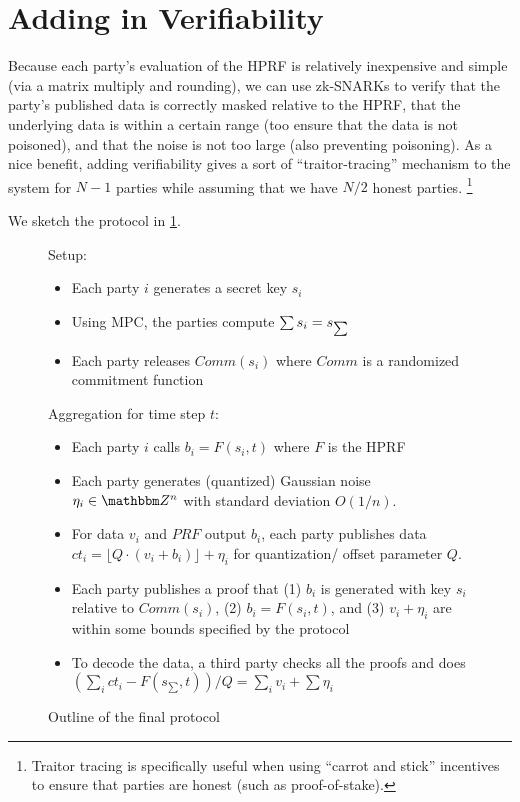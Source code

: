 \section{Adding in Verifiability}
Because each party's evaluation of the HPRF is relatively inexpensive and simple (via a matrix multiply and rounding), we can use zk-SNARKs to verify that the party's published data is correctly masked relative to the HPRF, that the underlying data is within a certain range (too ensure that the data is not poisoned), and that the noise is not too large (also preventing poisoning).
As a nice benefit, adding verifiability gives a sort of ``traitor-tracing'' mechanism to the system for $N - 1$ parties while assuming that we have $N /2$ honest parties.
\footnote{Traitor tracing is specifically useful when using ``carrot and stick'' incentives to ensure that parties are honest (such as proof-of-stake).}

We sketch the protocol in \cref{fig:prot}.


\begin{figure}[H]
	\begin{mdframed}
		Setup: \begin{itemize}
			\item Each party $i$ generates a secret key $s_i$
			\item Using MPC, the parties compute $\sum s_i = s_{\sum}$
			\item Each party releases $Comm(s_i)$ where $Comm$ is a randomized commitment function
		\end{itemize}
		Aggregation for time step $t$: \begin{itemize}
			\item Each party $i$ calls $b_i = F(s_i, t)$  where $F$ is the HPRF
			\item Each party generates (quantized) Gaussian noise $\eta_i \in \Z^n$ with standard deviation $O(1/n)$.
			\item  For data $v_i$ and $PRF$ output $b_i$,
				each party publishes data $ct_i = \lfloor Q \cdot (v_i + b_i) \rfloor  + \eta_i$ for quantization/ offset parameter $Q$.
			\item Each party publishes a proof that (1) $b_i$ is generated with key $s_i$ relative to $Comm(s_i)$, (2) $b_i = F(s_i, t)$, and (3) $v_i + \eta_i$ are within some bounds specified by the protocol
			\item To decode the data, a third party checks all the proofs and does $\left(\sum_i ct_i - F(s_{\sum}, t)\right) / Q = \sum_i v_i + \sum \eta_i$
		\end{itemize}
	\end{mdframed}
	\caption{Outline of the final protocol}
	\label{fig:prot}
\end{figure}

